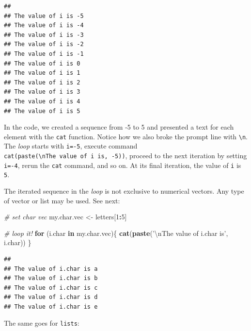 \documentclass[11pt,]{book}
\newenvironment{Shaded}{\begin{snugshade}}{\end{snugshade}}
\newcommand{\KeywordTok}[1]{\textcolor[rgb]{0.27,0.27,0.27}{\textbf{#1}}}
\newcommand{\DecValTok}[1]{\textcolor[rgb]{0.06,0.06,0.06}{#1}}
\newcommand{\CharTok}[1]{\textcolor[rgb]{0.5,0.5,0.5}{#1}}
\newcommand{\StringTok}[1]{\textcolor[rgb]{0.5,0.5,0.5}{#1}}
\newcommand{\CommentTok}[1]{\textcolor[rgb]{0.56,0.35,0.01}{\textit{#1}}}
\newcommand{\ControlFlowTok}[1]{\textcolor[rgb]{0.13,0.29,0.53}{\textbf{#1}}}
\newcommand{\OperatorTok}[1]{\textcolor[rgb]{0.81,0.36,0.00}{\textbf{#1}}}
\newcommand{\NormalTok}[1]{#1}
\begin{document}
\begin{verbatim}
## 
## The value of i is -5
## The value of i is -4
## The value of i is -3
## The value of i is -2
## The value of i is -1
## The value of i is 0
## The value of i is 1
## The value of i is 2
## The value of i is 3
## The value of i is 4
## The value of i is 5
\end{verbatim}

In the code, we created a sequence from -5 to 5 and presented a text for
each element with the \texttt{cat} function. Notice how we also broke
the prompt line with
\texttt{\textquotesingle{}\textbackslash{}n\textquotesingle{}}. The
\emph{loop} starts with \texttt{i=-5}, execute command
\texttt{cat(paste(\textquotesingle{}\textbackslash{}nThe\ value\ of\ i\ is\textquotesingle{},\ -5))},
proceed to the next iteration by setting \texttt{i=-4}, rerun the
\texttt{cat} command, and so on. At its final iteration, the value of
\texttt{i} is \texttt{5}.

The iterated sequence in the \emph{loop} is not exclusive to numerical
vectors. Any type of vector or list may be used. See next:

\begin{Shaded}
\begin{Highlighting}[]
\CommentTok{# set char vec}
\NormalTok{my.char.vec <-}\StringTok{ }\NormalTok{letters[}\DecValTok{1}\OperatorTok{:}\DecValTok{5}\NormalTok{]}

\CommentTok{# loop it!}
\ControlFlowTok{for}\NormalTok{ (i.char }\ControlFlowTok{in}\NormalTok{ my.char.vec)\{}
  \KeywordTok{cat}\NormalTok{(}\KeywordTok{paste}\NormalTok{(}\StringTok{'}\CharTok{\textbackslash{}n}\StringTok{The value of i.char is'}\NormalTok{, i.char))}
\NormalTok{\}}
\end{Highlighting}
\end{Shaded}

\begin{verbatim}
## 
## The value of i.char is a
## The value of i.char is b
## The value of i.char is c
## The value of i.char is d
## The value of i.char is e
\end{verbatim}

The same goes for \texttt{lists}:
\end{document}

